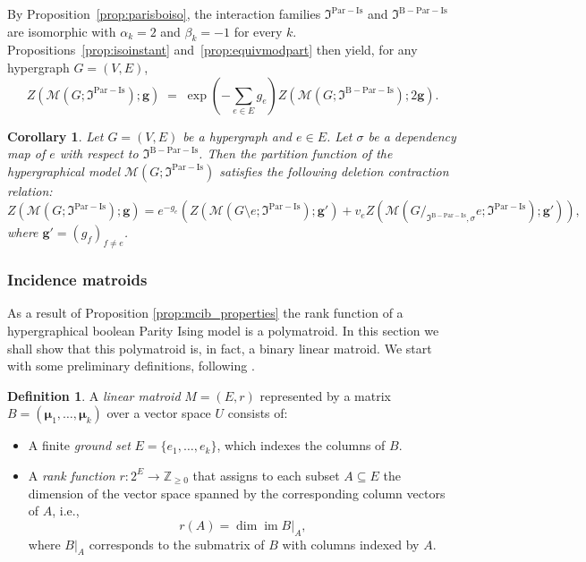\documentclass[11pt,reqno]{amsart}
\newcommand{\vecmu}{\boldsymbol{\mu}}
\newcommand{\vecg}{\boldsymbol{g}}
\newcommand{\Mo}{\mathcal{M}}
\newcommand{\mci}{\mathfrak{I}^{\mathrm{Par-Is}}}
\newcommand{\mcib}{\mathfrak{I}^{\mathrm{B-Par-Is}}}
\theoremstyle{plain}
\newtheorem{corollary}[theorem]{Corollary}
\theoremstyle{definition}
\newtheorem{definition}[theorem]{Definition}
\numberwithin{equation}{section}
\begin{document}
By Proposition~\ref{prop:parisboiso}, the interaction families $\mci$
and $\mcib$ are isomorphic with $\alpha_k = 2$ and $\beta_k = -1$ for
every $k$. Propositions~\ref{prop:isoinstant}
and~\ref{prop:equivmodpart} then yield, for any hypergraph $G = (V,E)$,
\begin{equation}
    Z(\Mo(G; \mci); \vecg)
    \;=\; \exp\!\left(- \sum_{e \in E} g_e \right)
          Z(\Mo(G; \mcib); 2 \vecg).
\end{equation}

\begin{corollary}
    \label{cor:isingdelcon}
    Let $G = (V,E)$ be a hypergraph and $e \in E$. Let $\sigma$ be a dependency map of $e$ with respect to $\mcib$. Then the partition function of the hypergraphical model $\Mo(G; \mci)$ satisfies the following deletion contraction relation:
     \[ Z(\Mo(G; \mci); \vecg) = e^{-g_e} \left(Z(\Mo(G \setminus e; \mci); \vecg') + v_e Z(\Mo(G /_{\mcib, \sigma} e; \mci); \vecg') \right),\]
     where $\vecg' = (g_f)_{f \neq e}$.
\end{corollary}

\subsubsection{Incidence matroids}
As a result of Proposition \ref{prop:mcib_properties} the rank function of a hypergraphical boolean Parity Ising model is a polymatroid. In this section we shall show that this polymatroid is, in fact, a binary linear matroid. We start with some preliminary definitions, following \cite{oxleymatroid}.

\begin{definition}
    \label{def:linmat}
    A \emph{linear matroid} $M = (E, r)$ represented by a matrix $B = (\vecmu_1, \dots, \vecmu_k)$ over a vector space $U$ consists of:
    \begin{itemize}
        \item A finite \emph{ground set} $E = \{e_1, \dots, e_k\}$, which indexes the columns of $B$.
        \item A \emph{rank function} $r: 2^E \to \mathbb{Z}_{\geq0}$ that assigns to each subset $A \subseteq E$ the dimension of the vector space spanned by the corresponding column vectors of $A$, i.e.,
        \[
            r(A) = \dim \operatorname{im} B|_A,
        \]
        where $B|_A$ corresponds to the submatrix of $B$ with columns indexed by $A$.
    \end{itemize}
\end{definition}
\end{document}
